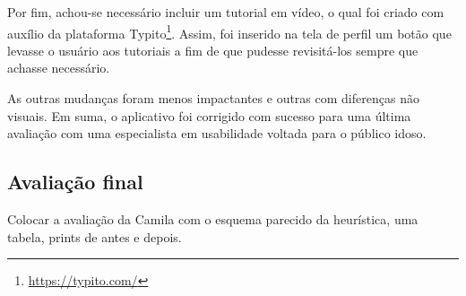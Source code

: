 Por fim, achou-se necessário incluir um tutorial em vídeo, o qual foi criado com auxílio da plataforma Typito\footnote{\url{https://typito.com/}}. Assim, foi inserido na tela de perfil um botão que levasse o usuário aos tutoriais a fim de que pudesse revisitá-los sempre que achasse necessário.


As outras mudanças foram menos impactantes e outras com diferenças não visuais. Em suma, o aplicativo foi corrigido com sucesso para uma última avaliação com uma especialista em usabilidade voltada para o público idoso.


\subsection{Avaliação final}
Colocar a avaliação da Camila com o esquema parecido da heurística, uma tabela, prints de antes e depois.